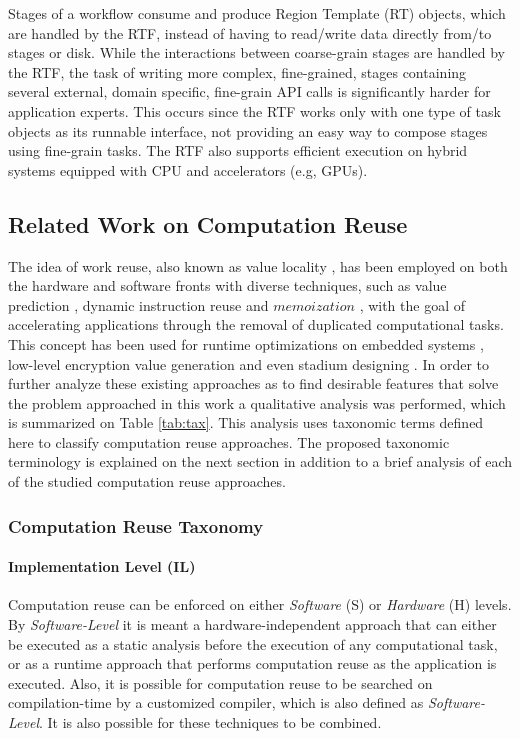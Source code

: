 Stages of a workflow consume and produce Region Template (RT) objects, which are handled by the RTF, instead of having to read/write data directly from/to stages or disk. While the interactions between coarse-grain stages are handled by the RTF, the task of writing more complex, fine-grained, stages containing several external, domain specific, fine-grain API  calls is significantly harder for application experts. This occurs since the RTF works only with one type of task objects as its runnable interface, not providing an easy way to compose stages using fine-grain tasks. The RTF also supports efficient execution on hybrid systems equipped with CPU and accelerators (e.g, GPUs).



\subsection{Related Work on Computation Reuse}
\label{sec:reuse_intro}

The idea of work reuse, also known as value locality \cite{reuse10,reuse14}, has been employed on both the hardware and software fronts with diverse techniques, such as value prediction \cite{reuse1}, dynamic instruction reuse \cite{reuse2} and $memoization$ \cite{reuse3}, with the goal of accelerating applications through the removal of duplicated computational tasks. This concept has been used for runtime optimizations on embedded systems \cite{reuse4}, low-level encryption value generation \cite{reuse5} and even stadium designing \cite{reuse6}. In order to further analyze these existing approaches as to find desirable features that solve the problem approached in this work a qualitative analysis was performed, which is summarized on Table \ref{tab:tax}. This analysis uses taxonomic terms defined here to classify computation reuse approaches. The proposed taxonomic terminology is explained on the next section in addition to a brief analysis of each of the studied computation reuse approaches.

\subsubsection{Computation Reuse Taxonomy}

\paragraph{Implementation Level (IL)}

Computation reuse can be enforced on either {\it Software} (S) or {\it Hardware} (H) levels. By {\it Software-Level} it is meant a hardware-independent approach that can either be executed as a static analysis before the execution of any computational task, or as a runtime approach that performs computation reuse as the application is executed. Also, it is possible for computation reuse to be searched on compilation-time by a customized compiler, which is also defined as {\it Software-Level}. It is also possible for these techniques to be combined.

